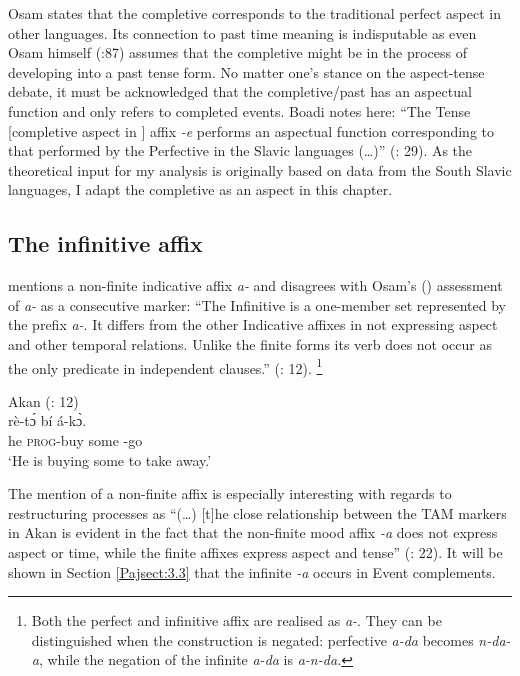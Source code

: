 \documentclass[output=paper]{langscibook}
\begin{document}
Osam states that the completive corresponds to the traditional perfect aspect in other languages. Its connection to past time meaning is indisputable as even Osam himself (\citeyear{osam2008}:87) assumes that the completive might be in the process of developing into a past tense form. No matter one’s stance on the aspect-tense debate, it must be acknowledged that the completive/past has an aspectual function and only refers to completed events. Boadi notes here: “The  Tense [completive aspect in \citet{osam2008}] affix \emph{-e} performs an aspectual function corresponding to that performed by the Perfective in the Slavic languages (…)” (\citeyear{osam2008}: 29). As the theoretical input for my analysis is originally based on data from the South Slavic languages, I adapt the completive as an aspect in this chapter. 

\subsection{The infinitive affix}

\citet{boadi2008} mentions a non-finite indicative affix \emph{a-} and disagrees with Osam’s (\citeyear{osam2008}) assessment of \emph{a-} as a consecutive marker: “The Infinitive is a one-member set represented by the prefix \emph{a-}. It differs from the other Indicative affixes in not expressing aspect and other temporal relations. Unlike the finite forms its verb does not occur as the only predicate in independent clauses.” (\citealt{boadi2008}: 12). \footnote{ Both the perfect and infinitive affix are realised as \emph{a-}. They can be distinguished when the construction is negated: perfective \emph{a-da} becomes \emph{n-da-a}, while the negation of the infinite \emph{a-da} is \emph{a-n-da.}}

\begin{exe}
\ex \label{Paj10} Akan (\citealt{boadi2008}: 12) \\ 
 {rè-t\'{ɔ}}  {bí} {á-k\`{{ɔ}}.}\\
    he \textsc{prog}-buy some -go\\
\glt `He is buying some to take away.’\\
\end{exe}



The mention of a non-finite affix is especially interesting with regards to restructuring processes as “(…) [t]he close relationship between the TAM markers in Akan is evident in the fact that the non-finite mood affix \emph{-a} does not express aspect or time, while the finite affixes express aspect and tense” (\citealt{owusu2014}: 22). It will be shown in Section \ref{Pajsect:3.3} that the infinite \emph{-a} occurs in Event complements. 
\end{document}
